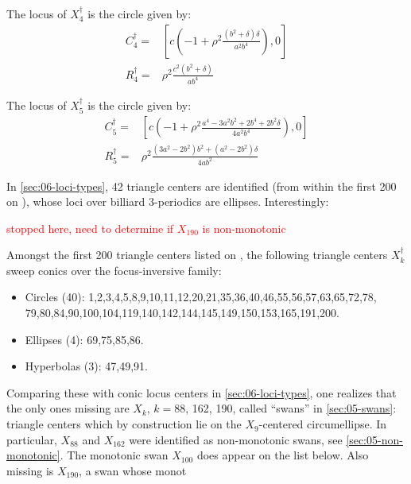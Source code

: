 \begin{proposition}
The locus of $X_4^\dagger$ is the circle given by:
\begin{align*}
C_4^\dagger=&\left[c\left(-1+\rho^2\frac{(b^2+\delta) \delta}{a^2 b^4}\right), 0\right]\\
R_4^\dagger=&\rho^2\frac{c^2(b^2+\delta)}{a b^4}
\end{align*}
\end{proposition}

\begin{proposition}
The locus of $X_5^\dagger$ is the circle given by:
\begin{align*}
C_5^\dagger=&\left[c\left(-1+ \rho^2\frac{a^4 - 3 a^2 b^2+2 b^4 + 2 b^2 \delta}{4 a^2 b^4}\right), 0\right]\\
R_5^\dagger=&\rho^2\frac{(3a^2-2b^2)b^2+(a^2-2b^2)\delta}{4a b^2}
\end{align*}
\end{proposition}

In \cref{sec:06-loci-types}, 42 triangle centers are identified (from within the first 200 on \cite{etc}), whose loci over billiard 3-periodics are ellipses. Interestingly:

\textcolor{red}{stopped here, need to determine if $X_{190}$ is non-monotonic}

\begin{observation}
Amongst the first 200 triangle centers listed on \cite{etc}, the following triangle centers $X_k^\dagger$ sweep conics over the focus-inversive family:

\begin{itemize}
\item Circles (40): 1,2,3,4,5,8,9,10,11,12,20,21,35,36,40,46,55,56,57,63,65,72,78, 79,80,84,90,100,104,119,140,142,144,145,149,150,153,165,191,200.
\item Ellipses (4): 69,75,85,86.
\item Hyperbolas (3): 47,49,91.
\end{itemize}
\end{observation}

Comparing these with conic locus centers in \cref{sec:06-loci-types}, one realizes that the only ones missing are $X_k$, $k=$88, 162, 190, called ``swans'' in \cref{sec:05-swans}: triangle centers which by construction lie on the $X_9$-centered circumellipse. In particular,  $X_{88}$ and $X_{162}$ were identified as non-monotonic swans, see \cref{sec:05-non-monotonic}. The monotonic swan $X_{100}$ does appear on the list below. Also missing is $X_{190}$, a swan whose monot

